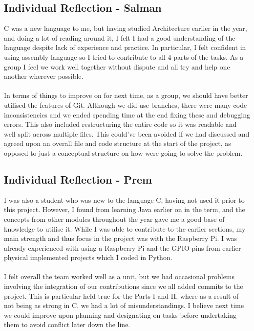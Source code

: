 \documentclass[11pt,twoside]{article}
\begin{document}
\subsection{Individual Reflection - Salman}
C was a new language to me, but having studied Architecture earlier in the year, and doing a lot of reading around it, I felt I had a good understanding of the language despite lack of experience and practice. In particular, I felt confident in using assembly language so I tried to contribute to all 4 parts of the tasks. As a group I feel we work well together without dispute and all try and help one another wherever possible.  \\\\
In terms of things to improve on for next time, as a group, we should have better utilised the features of Git. Although we did use branches, there were many code inconsistencies and we ended spending time at the end fixing these and debugging errors. This also included restructuring the entire code so it was readable and well split across multiple files. This could've been avoided if we had discussed and agreed upon an overall file and code structure at the start of the project, as opposed to just a conceptual structure on how were going to solve the problem.
\subsection{Individual Reflection - Prem}
I was also a student who was new to the language C, having not used it prior to this project. However, I found from learning Java earlier on in the term, and the concepts from other modules throughout the year gave me a good base of knowledge to utilise it. While I was able to contribute to the earlier sections, my main strength and thus focus in the project was with the Raspberry Pi. I was already experienced with using a Raspberry Pi and the GPIO pins from earlier physical implemented projects which I coded in Python.\\\\
I felt overall the team worked well as a unit, but we had occasional problems involving the integration of our contributions since we all added commits to the project. This is particular held true for the Parts I and II, where as a result of not being as strong in C, we had a lot of misunderstandings. I believe next time we could improve upon planning and designating on tasks before undertaking them to avoid conflict later down the line.
\end{document}
